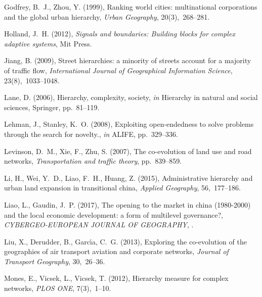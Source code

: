 \documentclass[11pt]{article}
\begin{document}
\begin{thebibliography}{xx}
Godfrey, B.~J., Zhou, Y. (1999), Ranking world cities: multinational
  corporations and the global urban hierarchy, {\em Urban Geography},
  20(3),~268--281.

Holland, J.~H. (2012), {\em Signals and boundaries: Building blocks for complex
  adaptive systems}, Mit Press.

Jiang, B. (2009), Street hierarchies: a minority of streets account for a
  majority of traffic flow, {\em International Journal of Geographical
  Information Science}, 23(8),~1033--1048.

Lane, D. (2006), Hierarchy, complexity, society, {\em in} Hierarchy in natural
  and social sciences, Springer, pp.~81--119.

Lehman, J., Stanley, K.~O. (2008), Exploiting open-endedness to solve problems
  through the search for novelty., {\em in} ALIFE, pp.~329--336.

Levinson, D.~M., Xie, F., Zhu, S. (2007), The co-evolution of land use and road
  networks, {\em Transportation and traffic theory}, pp.~839--859.

Li, H., Wei, Y.~D., Liao, F.~H., Huang, Z. (2015), Administrative hierarchy and
  urban land expansion in transitional china, {\em Applied Geography},
  56,~177--186.

Liao, L., Gaudin, J.~P. (2017), The opening to the market in china (1980-2000)
  and the local economic development: a form of multilevel governance?, {\em
  CYBERGEO-EUROPEAN JOURNAL OF GEOGRAPHY}, .

Liu, X., Derudder, B., Garc{\'\i}a, C.~G. (2013), Exploring the co-evolution of
  the geographies of air transport aviation and corporate networks, {\em
  Journal of Transport Geography}, 30,~26--36.

Mones, E., Vicsek, L., Vicsek, T. (2012), Hierarchy measure for complex
  networks, {\em PLOS ONE}, 7(3),~1--10.
\newline{}


\end{thebibliography}
\end{document}
